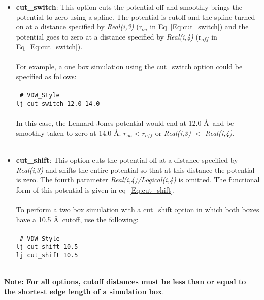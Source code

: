\begin{itemize}
%
\item \textbf{cut\_switch}: This option cuts the potential off and smoothly
brings the potential to zero using a spline. The potential is cutoff
and the spline turned on at a distance specified by \emph{Real(i,3)}
(r$_{on}$ in Eq~\ref{Eq:cut_switch}) and the potential goes
to zero at a distance specified by \emph{Real(i,4)} (r$_{off}$ in
Eq~\ref{Eq:cut_switch}). \\ \\ 
% 
For example, a one box simulation using the cut\_switch option could be
specified as follows:
\\ \\
\texttt{
\# VDW\_Style \\
lj cut\_switch 12.0 14.0} \\ \\
%
In this case, the Lennard-Jones potential would end at 12.0 \AA\ and
be smoothly taken to zero at 14.0 \AA. $r_{on} < r_{off}$ or \emph{Real(i,3)} $<$ \emph{Real(i,4)}.
%
\\ \\
\item \textbf{cut\_shift}: This option cuts the potential off at a distance
specified by \emph{Real(i,3)} and shifts the entire potential so that
at this distance the potential is zero. The fourth parameter
\emph{Real(i,4)/Logical(i,4)} is omitted. The functional form of this
potential is given in eq~\ref{Eq:cut_shift}. \\ \\
%
To perform a two box simulation with a cut\_shift option in which both
boxes have a 10.5 \AA\ cutoff, use the following:
\\ \\
\texttt{
\# VDW\_Style \\
lj cut\_shift 10.5 \\
lj cut\_shift 10.5 } \\ \\
%
\end{itemize}
{\bf Note: For all options, cutoff distances must be less than or
  equal to the shortest edge length of a simulation box}.
%
%
